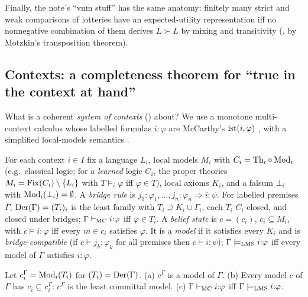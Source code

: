Finally, the note's ``vnm stuff'' has the same anatomy: finitely many strict and weak comparisons of lotteries have an expected-utility representation iff no nonnegative combination of them derives $L\succ L$ by mixing and transitivity (, by Motzkin's transposition theorem).

\subsection{Contexts: a completeness theorem for ``true in the context at hand''}\label{sec:existence:contexts}

What is a coherent \emph{system of contexts} () about? We use a monotone multi-context calculus whose labelled formulas $i{:}\varphi$ are McCarthy's $\mathrm{ist}(i,\varphi)$ \citep{mccarthy1993notes}, with a simplified local-models semantics \citep{ghidini2001local}.

\begin{definition}\label{def:existence:mcs}
For each context $i\in I$ fix a language $L_i$, local models $M_i$ with $C_i=\mathrm{Th}_i\circ\mathrm{Mod}_i$ (e.g.\ classical logic; for a \emph{learned} logic $C_i$, the proper theories $M_i=\mathrm{Fix}(C_i)\setminus\{L_i\}$ with $T\models_i\varphi$ iff $\varphi\in T$), local axioms $K_i$, and a falsum $\bot_i$ with $\mathrm{Mod}_i(\bot_i)=\emptyset$. A \emph{bridge rule} is $j_1{:}\varphi_1,\dots,j_n{:}\varphi_n\Rightarrow i{:}\psi$. For labelled premises $\Gamma$, $\mathrm{Der}(\Gamma)=(T_i)_i$ is the least family with $T_i\supseteq K_i\cup\Gamma_i$, each $T_i$ $C_i$-closed, and closed under bridges; $\Gamma\vdash_{\mathrm{MC}}i{:}\varphi$ iff $\varphi\in T_i$. A \emph{belief state} is $c=(c_i)$, $c_i\subseteq M_i$, with $c\models i{:}\varphi$ iff every $m\in c_i$ satisfies $\varphi$. It is a \emph{model} if it satisfies every $K_i$ and is \emph{bridge-compatible} (if $c\models j_k{:}\varphi_k$ for all premises then $c\models i{:}\psi$); $\Gamma\models_{\mathrm{LMS}}i{:}\varphi$ iff every model of $\Gamma$ satisfies $i{:}\varphi$.
\end{definition}

\begin{theorem}\label{thm:existence:mcs}
Let $c^\Gamma_i=\mathrm{Mod}_i(T_i)$ for $(T_i)=\mathrm{Der}(\Gamma)$. \textup{(a)} $c^\Gamma$ is a model of $\Gamma$. \textup{(b)} Every model $c$ of $\Gamma$ has $c_i\subseteq c^\Gamma_i$: $c^\Gamma$ is the least committal model. \textup{(c)} $\Gamma\vdash_{\mathrm{MC}}i{:}\varphi$ iff $\Gamma\models_{\mathrm{LMS}}i{:}\varphi$.
\end{theorem}

